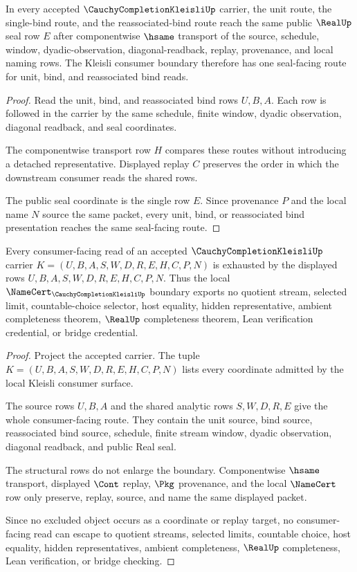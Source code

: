 \begin{theorem}
\label{thm:cauchy-completion-kleisli-seal-coherence}
In every accepted $\CauchyCompletionKleisliUp$ carrier, the unit route, the single-bind route, and the reassociated-bind route reach the same public $\RealUp$ seal row $E$ after componentwise $\hsame$ transport of the source, schedule, window, dyadic-observation, diagonal-readback, replay, provenance, and local naming rows. The Kleisli consumer boundary therefore has one seal-facing route for unit, bind, and reassociated bind reads.
\end{theorem}
\begin{proof}
Read the unit, bind, and reassociated bind rows $U,B,A$. Each row is followed in the carrier by the same schedule, finite window, dyadic observation, diagonal readback, and seal coordinates.

The componentwise transport row $H$ compares these routes without introducing a detached representative. Displayed replay $C$ preserves the order in which the downstream consumer reads the shared rows.

The public seal coordinate is the single row $E$. Since provenance $P$ and the local name $N$ source the same packet, every unit, bind, or reassociated bind presentation reaches the same seal-facing route.
\end{proof}

\begin{theorem}
\label{thm:cauchy-completion-kleisli-nonescape}
Every consumer-facing read of an accepted $\CauchyCompletionKleisliUp$ carrier $K=(U,B,A,S,W,D,R,E,H,C,P,N)$ is exhausted by the displayed rows $U,B,A,S,W,D,R,E,H,C,P,N$. Thus the local $\NameCert_{\CauchyCompletionKleisliUp}$ boundary exports no quotient stream, selected limit, countable-choice selector, host equality, hidden representative, ambient completeness theorem, $\RealUp$ completeness theorem, Lean verification credential, or bridge credential.
\end{theorem}
\begin{proof}
Project the accepted carrier. The tuple $K=(U,B,A,S,W,D,R,E,H,C,P,N)$ lists every coordinate admitted by the local Kleisli consumer surface.

The source rows $U,B,A$ and the shared analytic rows $S,W,D,R,E$ give the whole consumer-facing route. They contain the unit source, bind source, reassociated bind source, schedule, finite stream window, dyadic observation, diagonal readback, and public Real seal.

The structural rows do not enlarge the boundary. Componentwise $\hsame$ transport, displayed $\Cont$ replay, $\Pkg$ provenance, and the local $\NameCert$ row only preserve, replay, source, and name the same displayed packet.

Since no excluded object occurs as a coordinate or replay target, no consumer-facing read can escape to quotient streams, selected limits, countable choice, host equality, hidden representatives, ambient completeness, $\RealUp$ completeness, Lean verification, or bridge checking.
\end{proof}

